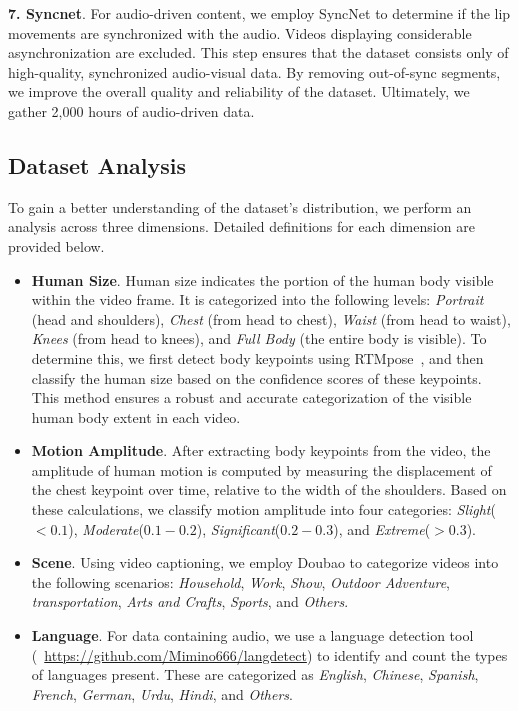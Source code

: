 \documentclass{article} %
\begin{document}
\textbf{7. Syncnet}. For audio-driven content, we employ SyncNet \citep{syncnet} to determine if the lip movements are synchronized with the audio. Videos displaying considerable asynchronization are excluded. This step ensures that the dataset consists only of high-quality, synchronized audio-visual data. By removing out-of-sync segments, we improve the overall quality and reliability of the dataset. Ultimately, we gather 2,000 hours of audio-driven data.

\subsection{Dataset Analysis}
To gain a better understanding of the dataset's distribution, we perform an analysis across three dimensions. Detailed definitions for each dimension are provided below.

\begin{itemize}
\item \textbf{Human Size}. Human size indicates the portion of the human body visible within the video frame. It is categorized into the following levels: \textit{Portrait} (head and shoulders), \textit{Chest} (from head to chest), \textit{Waist} (from head to waist), \textit{Knees} (from head to knees), and \textit{Full Body} (the entire body is visible). To determine this, we first detect body keypoints using RTMpose~\citep{jiang2023rtmpose}, and then classify the human size based on the confidence scores of these keypoints. This method ensures a robust and accurate categorization of the visible human body extent in each video.
\item \textbf{Motion Amplitude}. After extracting body keypoints from the video, the amplitude of human motion is computed by measuring the displacement of the chest keypoint over time, relative to the width of the shoulders. Based on these calculations, we classify motion amplitude into four categories: \textit{Slight}($<0.1$), \textit{Moderate}($0.1-0.2$), \textit{Significant}($0.2-0.3$), and \textit{Extreme}($>0.3$).
\item \textbf{Scene}. Using video captioning, we employ Doubao to categorize videos into the following scenarios: \textit{Household}, \textit{Work}, \textit{Show}, \textit{Outdoor Adventure}, \textit{transportation}, \textit{Arts and Crafts}, \textit{Sports}, and \textit{Others}.
\item \textbf{Language}. For data containing audio, we use a language detection tool (~\href{https://github.com/Mimino666/langdetect}{https://github.com/Mimino666/langdetect}) to identify and count the types of languages present. These are categorized as \textit{English}, \textit{Chinese}, \textit{Spanish}, \textit{French}, \textit{German}, \textit{Urdu}, \textit{Hindi}, and \textit{Others}.
\end{itemize}
\end{document}
